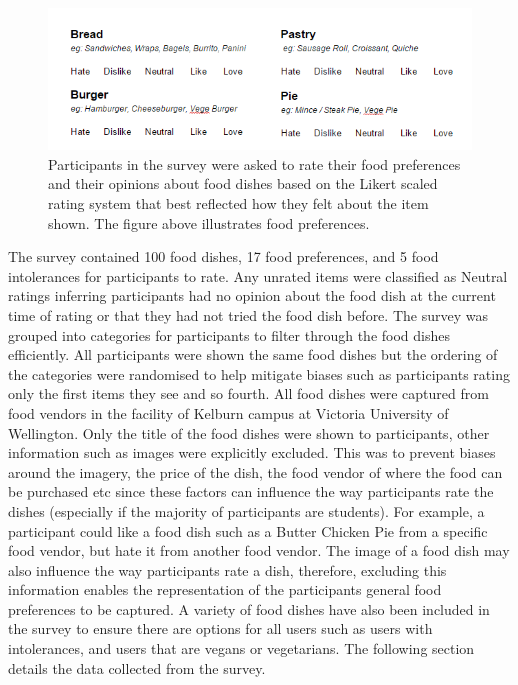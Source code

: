 \begin{figure}
\centering
\includegraphics[scale=1.0]{images/survey_preferences.png}
\caption{Participants in the survey were asked to rate their food preferences and their opinions about food dishes based on the Likert scaled rating system that best reflected how they felt about the item shown. The figure above illustrates food preferences.}
\label{fig:survey}
\end{figure}

The survey contained 100 food dishes, 17 food preferences, and 5 food intolerances for participants to rate. Any unrated items were classified as Neutral ratings inferring participants had no opinion about the food dish at the current time of rating or that they had not tried the food dish before. The survey was grouped into categories for participants to filter through the food dishes efficiently. All participants were shown the same food dishes but the ordering of the categories were randomised to help mitigate biases such as participants rating only the first items they see and so fourth. All food dishes were captured from food vendors in the facility of Kelburn campus at Victoria University of Wellington. Only the title of the food dishes were shown to participants, other information such as images were explicitly excluded. This was to prevent biases around the imagery, the price of the dish, the food vendor of where the food can be purchased etc since these factors can influence the way participants rate the dishes (especially if the majority of participants are students). For example, a participant could like a food dish such as a Butter Chicken Pie from a specific food vendor, but hate it from another food vendor. The image of a food dish may also influence the way participants rate a dish, therefore, excluding this information enables the representation of the participants general food preferences to be captured. A variety of food dishes have also been included in the survey to ensure there are options for all users such as users with intolerances, and users that are vegans or vegetarians. The following section details the data collected from the survey. 

